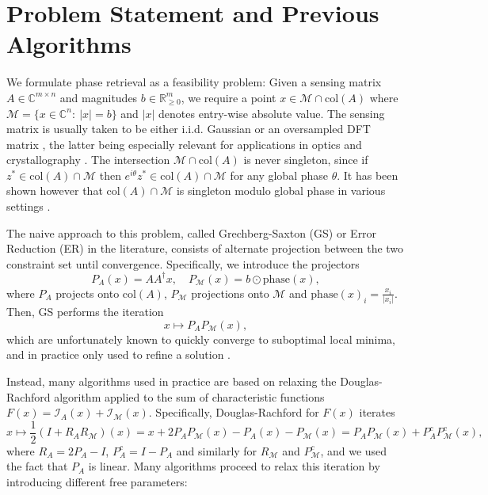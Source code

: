 \documentclass[12pt]{article}
\theoremstyle{definition}
\theoremstyle{remark}
\theoremstyle{definition}
\theoremstyle{problem}
\theoremstyle{definition}
\newcommand{\col}{\text{col}}
\newcommand{\phase}{\text{phase}}
\newcommand{\RR}{\mathbb{R} }
\newcommand{\II}{\mathcal{I} }
\newcommand{\CC}{\mathbb{C}}
\newcommand{\MM}{\mathcal{M}}
\newcommand{\TODO}[1]{{\color{red}{[#1]}}}
\begin{document}
\section{Problem Statement and Previous Algorithms}
We formulate phase retrieval as a feasibility problem: Given a sensing matrix $A\in\CC^{m\times n}$ and magnitudes $b\in\RR^{m}_{\geq 0}$, we require a point $x\in\MM\cap \col(A)$ where $\MM=\{x\in\CC^n:\ |x|=b\}$ and $|x|$ denotes entry-wise absolute value. The sensing matrix is usually taken to be either i.i.d. Gaussian or an oversampled DFT matrix \cite{Bendory2017}, the latter being especially relevant for applications in optics and crystallography \cite{Elser2017, Luke2005}. The intersection $\MM\cap\col(A)$ is never singleton, since if $z^*\in\col(A)\cap\MM$ then $e^{i\theta}z^*\in\col(A)\cap \MM$ for any global phase $\theta$. It has been shown however that $\col(A)\cap\MM$ is singleton modulo global phase in various settings \cite{Bandeira2014,Bendory2017,Conca2015}. \TODO{Expand on this?}

The naive approach to this problem, called Grechberg-Saxton (GS) or Error Reduction (ER) in the literature, consists of alternate projection between the two constraint set until convergence. Specifically, we introduce the projectors 
\begin{equation}\label{eq:projections}
    P_A(x) = AA^{\dagger}x, \quad P_{\MM}(x)=b\odot \phase(x),
\end{equation}
where $P_A$ projects onto $\col(A)$, $P_{\MM}$ projections onto $\MM$ and $\phase(x)_i=\frac{x_i}{|x_i|}$. Then, GS performs the iteration 
\begin{equation}\label{eq:GS}
    x\mapsto P_AP_{\MM}(x),    
\end{equation}
which are unfortunately known to quickly converge to suboptimal local minima, and in practice only used to refine a solution \cite{Elser2017, Marchesini2007}. 

Instead, many algorithms used in practice are based on relaxing the Douglas-Rachford algorithm applied to the sum of characteristic functions $F(x) = \II_{A}(x)+\II_{\MM}(x)$. Specifically, Douglas-Rachford for $F(x)$ iterates \begin{equation}\label{eq:Doug_Rach}
    x\mapsto \frac{1}{2}(I+R_AR_{\MM})(x) = x + 2P_AP_{\MM}(x) - P_A(x) - P_{\MM}(x) = P_AP_{\MM}(x) + P_A^cP_{\MM}^c(x),
\end{equation} 
where $R_A = 2P_A-I$, $P_A^c=I-P_A$ and similarly for $R_{\MM}$ and $P_{\MM}^c$, and we used the fact that $P_A$ is linear. Many algorithms proceed to relax this iteration by introducing different free parameters\TODO{Rewrite in terms of reflections?}:
\end{document}
